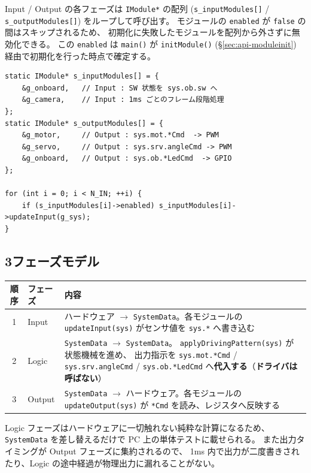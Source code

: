 \documentclass[a4paper,11pt,dvipdfmx]{jsarticle}
\begin{document}
Input / Output の各フェーズは \texttt{IModule*} の配列 (\texttt{s\_inputModules[]} /
\texttt{s\_outputModules[]}) をループして呼び出す。
モジュールの \texttt{enabled} が \texttt{false} の間はスキップされるため、
初期化に失敗したモジュールを配列から外さずに無効化できる。
この \texttt{enabled} は \texttt{main()} が \texttt{initModule()}
(\hyperref[sec:api-moduleinit]{§\ref*{sec:api-moduleinit}}) 経由で初期化を行った時点で確定する。

\begin{lstlisting}[caption={Input / Output フェーズの配列駆動 (mcr\_camera\_2026base.cpp)},label=lst:phasearray]
static IModule* s_inputModules[] = {
    &g_onboard,   // Input : SW 状態を sys.ob.sw へ
    &g_camera,    // Input : 1ms ごとのフレーム段階処理
};
static IModule* s_outputModules[] = {
    &g_motor,     // Output : sys.mot.*Cmd  -> PWM
    &g_servo,     // Output : sys.srv.angleCmd -> PWM
    &g_onboard,   // Output : sys.ob.*LedCmd  -> GPIO
};

for (int i = 0; i < N_IN; ++i) {
    if (s_inputModules[i]->enabled) s_inputModules[i]->updateInput(g_sys);
}
\end{lstlisting}

\subsection{3フェーズモデル}\label{sec:threephase}

\begin{tabularx}{\textwidth}{c l X}
\toprule
\textbf{順序} & \textbf{フェーズ} & \textbf{内容} \\
\midrule
1 & Input  & ハードウェア $\rightarrow$ \texttt{SystemData}。各モジュールの
             \texttt{updateInput(sys)} がセンサ値を \texttt{sys.*} へ書き込む \\
2 & Logic  & \texttt{SystemData} $\rightarrow$ \texttt{SystemData}。
             \texttt{applyDrivingPattern(sys)} が状態機械を進め、
             出力指示を \texttt{sys.mot.*Cmd} / \texttt{sys.srv.angleCmd} /
             \texttt{sys.ob.*LedCmd} へ\textbf{代入する}（\textbf{ドライバは呼ばない}） \\
3 & Output & \texttt{SystemData} $\rightarrow$ ハードウェア。各モジュールの
             \texttt{updateOutput(sys)} が \texttt{*Cmd} を読み、レジスタへ反映する \\
\bottomrule
\end{tabularx}

\begin{notebox}[3フェーズ分離の利点]
Logic フェーズはハードウェアに一切触れない純粋な計算になるため、
\texttt{SystemData} を差し替えるだけで PC 上の単体テストに載せられる。
また出力タイミングが Output フェーズに集約されるので、
1ms 内で出力が二度書きされたり、Logic の途中経過が物理出力に漏れることがない。
\end{notebox}
\end{document}
